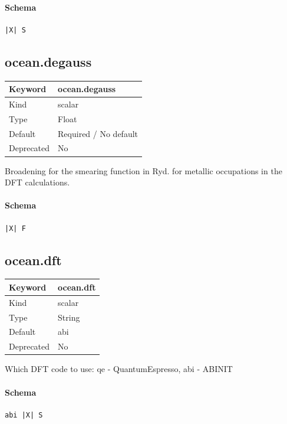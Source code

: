 \documentclass[11pt]{article}
\begin{document}
{{{{{\paragraph{Schema}
\begin{Verbatim}
|X| S
\end{Verbatim}

\subsection{ocean.degauss}
\label{kw:ocean-degauss}
\begin{longtable}{|p{1.5in}|p{4.5in}|}
\hline
Keyword & ocean.degauss \\
\hline
Kind & scalar \\
\hline
Type & Float \\
\hline
Default & Required / No default \\
\hline
Deprecated & No \\
\hline
\end{longtable}
 Broadening for the smearing function in Ryd. for metallic occupations in the
 DFT calculations.

\paragraph{Schema}
\begin{Verbatim}
|X| F
\end{Verbatim}

\subsection{ocean.dft}
\label{kw:ocean-dft}
\begin{longtable}{|p{1.5in}|p{4.5in}|}
\hline
Keyword & ocean.dft \\
\hline
Kind & scalar \\
\hline
Type & String \\
\hline
Default & abi \\
\hline
Deprecated & No \\
\hline
\end{longtable}
 Which DFT code to use: qe - QuantumEspresso, abi - ABINIT

\paragraph{Schema}
\begin{Verbatim}
abi |X| S
\end{Verbatim}

}}}}}
\end{document}
